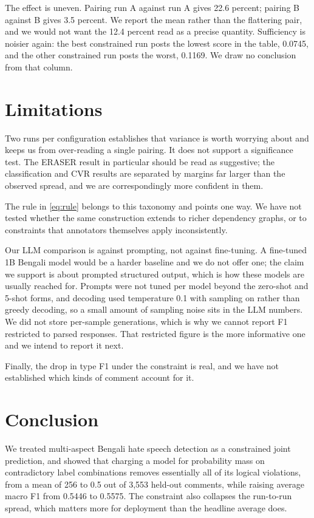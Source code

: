 \documentclass[conference]{IEEEtran}
\begin{document}
The effect is uneven. Pairing run A against run A gives 22.6 percent; pairing B against B gives 3.5 percent. We report the mean rather than the flattering pair, and we would not want the 12.4 percent read as a precise quantity. Sufficiency is noisier again: the best constrained run posts the lowest score in the table, 0.0745, and the other constrained run posts the worst, 0.1169. We draw no conclusion from that column.

\section{Limitations}
\label{sec:limits}
Two runs per configuration establishes that variance is worth worrying about and keeps us from over-reading a single pairing. It does not support a significance test. The ERASER result in particular should be read as suggestive; the classification and CVR results are separated by margins far larger than the observed spread, and we are correspondingly more confident in them.

The rule in \eqref{eq:rule} belongs to this taxonomy and points one way. We have not tested whether the same construction extends to richer dependency graphs, or to constraints that annotators themselves apply inconsistently.

Our LLM comparison is against prompting, not against fine-tuning. A fine-tuned 1B Bengali model would be a harder baseline and we do not offer one; the claim we support is about prompted structured output, which is how these models are usually reached for. Prompts were not tuned per model beyond the zero-shot and 5-shot forms, and decoding used temperature 0.1 with sampling on rather than greedy decoding, so a small amount of sampling noise sits in the LLM numbers. We did not store per-sample generations, which is why we cannot report F1 restricted to parsed responses. That restricted figure is the more informative one and we intend to report it next.

Finally, the drop in type F1 under the constraint is real, and we have not established which kinds of comment account for it.

\section{Conclusion}
We treated multi-aspect Bengali hate speech detection as a constrained joint prediction, and showed that charging a model for probability mass on contradictory label combinations removes essentially all of its logical violations, from a mean of 256 to 0.5 out of 3{,}553 held-out comments, while raising average macro F1 from 0.5446 to 0.5575. The constraint also collapses the run-to-run spread, which matters more for deployment than the headline average does.
\end{document}

